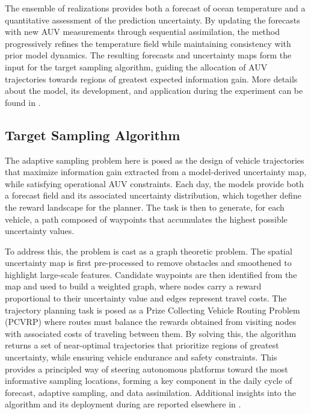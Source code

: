 The ensemble of realizations provides both a forecast of ocean
temperature and a quantitative assessment of the prediction
uncertainty.  By updating the forecasts with new AUV measurements
through sequential assimilation, the method progressively refines the
temperature field while maintaining consistency with prior model
dynamics. The resulting forecasts and uncertainty maps form the input
for the target sampling algorithm, guiding the allocation of AUV
trajectories towards regions of greatest expected information
gain. More details about the model, its development, and application
during the \proj experiment can be found in \cite{Duarte2025}.

\subsection{Target Sampling Algorithm}

The adaptive sampling problem here is posed as the design of vehicle
trajectories that maximize information gain
\cite{eidsvik2015,fossum18} extracted from a model-derived uncertainty
map, while satisfying operational AUV constraints. Each day, the
models provide both a forecast field and its associated uncertainty
distribution, which together define the reward landscape for the
planner. The task is then to generate, for each vehicle, a path
composed of waypoints that accumulates the highest possible
uncertainty values.

To address this, the problem is cast as a graph theoretic problem. The
spatial uncertainty map is first pre-processed to remove obstacles and
smoothened to highlight large-scale features. Candidate waypoints are
then identified from the map and used to build a weighted graph, where
nodes carry a reward proportional to their uncertainty value and edges
represent travel costs. The trajectory planning task is posed as a
Prize Collecting Vehicle Routing Problem
(PCVRP)\cite{vidal2013,toth2014vehicle} where routes must balance the
rewards obtained from visiting nodes with associated costs of
traveling between them. By solving this, the algorithm returns a set
of near-optimal trajectories that prioritize regions of greatest
uncertainty, while ensuring vehicle endurance and safety
constraints. This provides a principled way of steering autonomous
platforms toward the most informative sampling locations, forming a
key component in the daily cycle of forecast, adaptive sampling, and
data assimilation. Additional insights into the algorithm and its
deployment during \proj are reported elsewhere in
\cite{bernacchi2025}.

